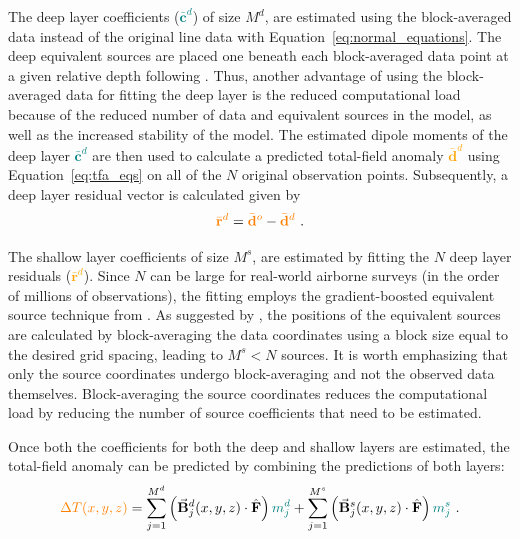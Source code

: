The deep layer coefficients (\textcolor{teal}{$\bar{\mathbf{c}}^d$}) of size $M^d$, are estimated using the block-averaged data instead of the original line data with Equation~\ref{eq:normal_equations}. The deep equivalent sources are placed one beneath each block-averaged data point at a given relative depth following \citet{Soler2021}. Thus, another advantage of using the block-averaged data for fitting the deep layer is the reduced computational load because of the reduced number of data and equivalent sources in the model, as well as the increased stability of the model. The estimated dipole moments of the deep layer \textcolor{teal}{$\bar{\mathbf{c}}^d$} are then used to calculate a predicted total-field anomaly \textcolor{orange}{$\bar{\mathbf{d}}^d$} using Equation~\ref{eq:tfa_eqs} on all of the $N$ original observation points.
Subsequently, a deep layer residual vector is calculated given by
\begin{equation}
    \textcolor{orange}{\bar{\mathbf{r}}^d} = \textcolor{orange}{\bar{\mathbf{d}}^o} - \textcolor{orange}{\bar{\mathbf{d}}^d}
    \ .
    \label{eq:deep_residual}
\end{equation}

The shallow layer coefficients of size $M^s$, are estimated by fitting the $N$ deep layer residuals (\textcolor{orange}{$\bar{\mathbf{r}}^d$}). Since $N$ can be large for real-world airborne surveys (in the order of millions of observations), the fitting employs the gradient-boosted equivalent source technique from \citet{Soler2021}. As suggested by \citet{Soler2021}, the positions of the equivalent sources are calculated by block-averaging the data coordinates using a block size equal to the desired grid spacing, leading to $M^s < N$ sources. It is worth emphasizing that only the source coordinates undergo block-averaging and not the observed data themselves. Block-averaging the source coordinates reduces the computational load by reducing the number of source coefficients that need to be estimated.

Once both the coefficients for both the deep and shallow layers are estimated, the total-field anomaly can be predicted by combining the predictions of both layers:
\begin{equation}
    \label{eq:tfa_eqs_dual_layer}
  \textcolor{orange}{\Delta T (x, y, z)} = \sum_{j=1}^{M^d} \left(\vec{\mathbf{B}}^d_j(x, y, z) \cdot \hat{\mathbf{F}}\right) \textcolor{teal}{m_j^d}
  +  \sum_{j=1}^{M^s} \left(\vec{\mathbf{B}}^s_j(x, y, z) \cdot \hat{\mathbf{F}}\right) \textcolor{teal}{m_j^s}
  \ .
\end{equation}

